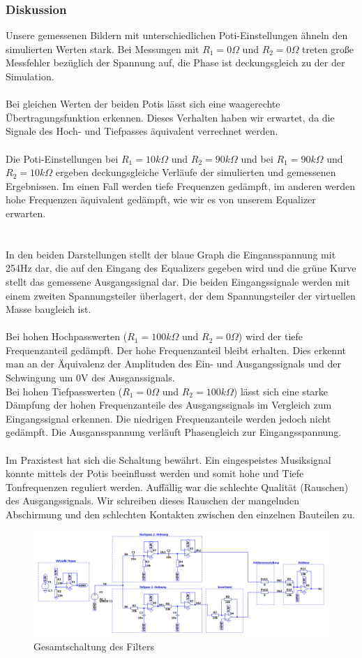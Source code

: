 \subsubsection{Diskussion}

Unsere gemessenen Bildern mit unterschiedlichen Poti-Einstellungen ähneln den simulierten Werten stark. Bei Messungen mit $R_1 = 0\Omega$ und $R_2 = 0\Omega$ treten große Messfehler bezüglich der Spannung auf, die Phase ist deckungsgleich zu der der Simulation.
\\
\\
Bei gleichen Werten der beiden Potis lässt sich eine waagerechte Übertragungsfunktion erkennen. Dieses Verhalten haben wir erwartet, da die Signale des Hoch- und Tiefpasses äquivalent verrechnet werden.
\\
\\
Die Poti-Einstellungen bei $R_1 = 10k\Omega$ und $R_2 = 90k\Omega$ und bei $R_1 = 90k\Omega$ und $R_2 = 10k\Omega$ ergeben deckungsgleiche Verläufe der simulierten und gemessenen Ergebnissen. Im einen Fall werden tiefe Frequenzen gedämpft, im anderen werden hohe Frequenzen äquivalent gedämpft, wie wir es von unserem Equalizer erwarten.
\\
\\
\\
In den beiden Darstellungen stellt der blaue Graph die Eingansspannung mit 254Hz dar, die auf den Eingang des Equalizers gegeben wird und die grüne Kurve stellt das gemessene Ausgangssignal dar. Die beiden Eingangssignale werden mit einem zweiten Spannungsteiler überlagert, der dem Spannungsteiler der virtuellen Masse baugleich ist. 
\\
\\
Bei hohen Hochpasswerten ($R_{1} = 100k\Omega$ und $R_{2} = 0\Omega$) wird der tiefe Frequenzanteil gedämpft. Der hohe Frequenzanteil bleibt erhalten. Dies erkennt man an der Äquivalenz der Amplituden des Ein- und Ausgangssignals und der Schwingung um 0V des Ausganssignals.
\\
Bei hohen Tiefpasswerten ($R_{1} = 0\Omega$ und $R_{2} = 100k\Omega$) lässt sich eine starke Dämpfung der hohen Frequenzanteile des Ausgangssignals im Vergleich zum Eingangssignal erkennen. Die niedrigen Frequenzanteile werden jedoch nicht gedämpft. Die Ausgansspannung verläuft Phasengleich zur Eingangsspannung.
\\
\\
Im Praxistest hat sich die Schaltung bewährt. Ein eingespeistes Musiksignal konnte mittels der Potis beeinflusst werden und somit hohe und Tiefe Tonfrequenzen reguliert werden. Auffällig war die schlechte Qualität (Rauschen) des Ausgangssignals. Wir schreiben dieses Rauschen der mangelnden Abschirmung und den schlechten Kontakten zwischen den einzelnen Bauteilen zu.

\newpage
\begin{figure}
    \includegraphics[width=22cm]{./pictures/Schaltung}
    \caption{Gesamtschaltung des Filters}
    \label{fig:Gesamtschaltung}
\end{figure}